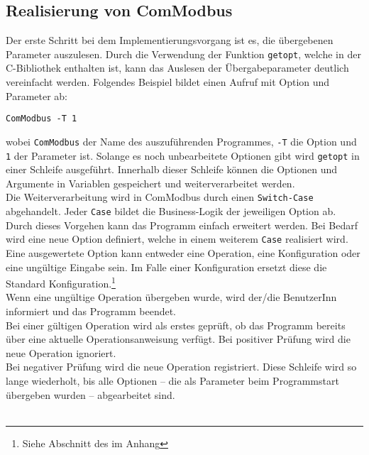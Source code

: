 \documentclass[Bachelorarbeit.tex]{subfiles}
\begin{document}
\subsection{Realisierung von ComModbus}
Der erste Schritt bei dem Implementierungsvorgang ist es, die übergebenen Parameter auszulesen.
Durch die Verwendung der Funktion \texttt{getopt}, welche in der C-Bibliothek enthalten ist, kann das Auslesen der Übergabeparameter deutlich vereinfacht werden. 
Folgendes Beispiel bildet einen Aufruf mit Option und Parameter ab:
\begin{verbatim}
ComModbus -T 1
\end{verbatim}
wobei \texttt{ComModbus} der Name des auszuführenden Programmes, \texttt{-T} die Option und 
\texttt{1} der Parameter ist.
Solange es noch unbearbeitete Optionen gibt wird \texttt{getopt} in einer Schleife ausgeführt. 
Innerhalb dieser Schleife können die Optionen und Argumente in Variablen 
gespeichert und weiterverarbeitet werden. \\
Die Weiterverarbeitung wird in ComModbus durch einen \texttt{Switch-Case} abgehandelt. Jeder \texttt{Case} bildet die Business-Logik der jeweiligen Option ab. Durch dieses Vorgehen kann das Programm 
einfach erweitert werden. Bei Bedarf wird eine neue Option definiert, welche in einem 
weiterem \texttt{Case} realisiert wird. \\
Eine ausgewertete Option kann entweder eine Operation, eine 
Konfiguration oder eine ungültige Eingabe sein. Im Falle einer Konfiguration ersetzt 
diese die Standard Konfiguration.\footnote{Siehe Abschnitt   des  im Anhang} \\
Wenn eine ungültige Operation übergeben wurde, wird der/die BenutzerInn informiert und das Programm beendet. \\
Bei einer gültigen Operation wird als erstes geprüft, ob das Programm bereits über eine aktuelle Operationsanweisung verfügt. Bei positiver Prüfung wird die neue Operation ignoriert.\\ 
Bei negativer Prüfung wird die neue Operation registriert. Diese Schleife  
wird so lange wiederholt, bis alle Optionen – die als Parameter beim 
Programmstart übergeben wurden – abgearbeitet sind.\\
\\
\end{document}
